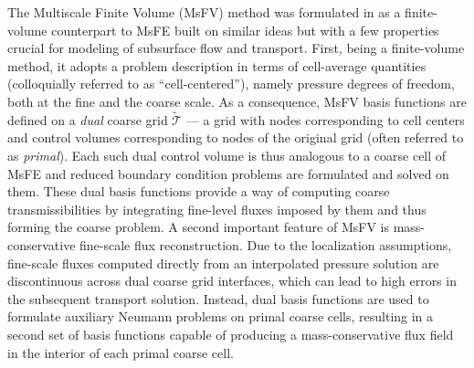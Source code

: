 The Multiscale Finite Volume (MsFV) method was formulated in \cite{Jenny2003} as a finite-volume counterpart to MsFE built on similar ideas but with a few properties crucial for modeling of subsurface flow and transport.   First, being a finite-volume method, it adopts a problem description in terms of cell-average quantities (colloquially referred to as ``cell-centered''), namely pressure degrees of freedom, both at the fine and the coarse scale.   As a consequence, MsFV basis functions are defined on a \textit{dual} coarse grid $\tilde{\mathcal{T}}$ --- a grid with nodes corresponding to cell centers and control volumes corresponding to nodes of the original grid (often referred to as \textit{primal}).   Each such dual control volume is thus analogous to a coarse cell of MsFE and reduced boundary condition problems  are formulated and solved on them.   These dual basis functions provide a way of computing coarse transmissibilities by integrating fine-level fluxes imposed by them and thus forming the coarse problem.   A second important feature of MsFV is mass-conservative fine-scale flux reconstruction.   Due to the localization assumptions, fine-scale fluxes computed directly from an interpolated pressure solution are discontinuous across dual coarse grid interfaces, which can lead to high errors in the subsequent transport solution.   Instead, dual basis functions are used to formulate auxiliary Neumann problems on primal coarse cells, resulting in a second set of basis functions capable of producing a mass-conservative flux field in the interior of each primal coarse cell.

